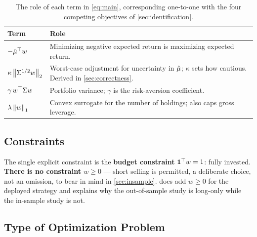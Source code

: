 \begin{table}[htbp]
\centering
\caption{The role of each term in \cref{eq:main}, corresponding one-to-one with the four
competing objectives of \cref{sec:identification}.}
\label{tab:terms}
\small
\begin{tabular}{@{}ll@{}}
\toprule
\textbf{Term} & \textbf{Role} \\
\midrule
$-\hat{\mu}^\top w$
  & Minimizing negative expected return is maximizing expected return. \\[2pt]
$\kappa \left\lVert \Sigma^{1/2} w \right\rVert_2$
  & Worst-case adjustment for uncertainty in $\hat{\mu}$; $\kappa$ sets how cautious.
    Derived in \cref{sec:correctness}. \\[2pt]
$\gamma\, w^\top \Sigma w$
  & Portfolio variance; $\gamma$ is the risk-aversion coefficient. \\[2pt]
$\lambda \left\lVert w \right\rVert_1$
  & Convex surrogate for the number of holdings; also caps gross leverage. \\
\bottomrule
\end{tabular}
\end{table}

\subsection{Constraints}

The single explicit constraint is the \textbf{budget constraint} $\mathbf{1}^\top w = 1$: fully
invested. \textbf{There is no constraint $w \ge 0$} --- short selling is permitted, a deliberate
choice, not an omission, to bear in mind in \cref{sec:insample}.  does add
$w \ge 0$ for the deployed strategy and explains why the out-of-sample study is long-only while
the in-sample study is not.

\subsection{Type of Optimization Problem}

